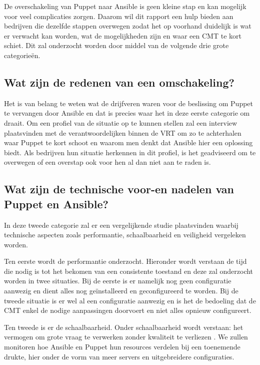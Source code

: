 De overschakeling van Puppet naar Ansible is geen kleine stap en kan mogelijk voor veel complicaties zorgen. Daarom wil dit rapport een hulp bieden aan bedrijven die dezelfde stappen overwegen zodat het op voorhand duidelijk is wat er verwacht kan worden, wat de mogelijkheden zijn en waar een \gls{CMT} te kort schiet. Dit zal onderzocht worden door middel van de volgende drie grote categorie\"en. 


\subsection{Wat zijn de redenen van een omschakeling?}

Het is van belang te weten wat de drijfveren waren voor de beslissing om Puppet te vervangen door Ansible en dat is precies waar het in deze eerste categorie om draait. Om een profiel van de situatie op te kunnen stellen zal een interview plaatsvinden met de verantwoordelijken binnen de \gls{VRT} om zo te achterhalen waar Puppet te kort schoot en waarom men denkt dat Ansible hier een oplossing biedt. Als bedrijven hun situatie herkennen in dit profiel, is het geadviseerd om te overwegen of een overstap ook voor hen al dan niet aan te raden is.

\subsection{Wat zijn de technische voor-en nadelen van Puppet en Ansible?}

In deze tweede categorie zal er een vergelijkende studie plaatsvinden waarbij technische aspecten zoals performantie, schaalbaarheid en veiligheid vergeleken worden. 
 
 Ten eerste wordt de performantie onderzocht. Hieronder wordt verstaan de tijd die nodig is tot het bekomen van een consistente toestand en deze zal onderzocht worden in twee situaties. Bij de eerste is er namelijk nog geen configuratie aanwezig en dient alles nog ge\"installeerd en geconfigureerd te worden. Bij de tweede situatie is er wel al een configuratie aanwezig en is het de bedoeling dat de \gls{CMT} enkel de nodige aanpassingen doorvoert en niet alles opnieuw configureert. 

Ten tweede is er de schaalbaarheid. Onder schaalbaarheid wordt verstaan: het vermogen om grote vraag te verwerken zonder kwaliteit te verliezen \autocite{informit}. We zullen monitoren hoe Ansible en Puppet hun resources verdelen bij een toenemende drukte, hier onder de vorm van meer servers en uitgebreidere configuraties. 

